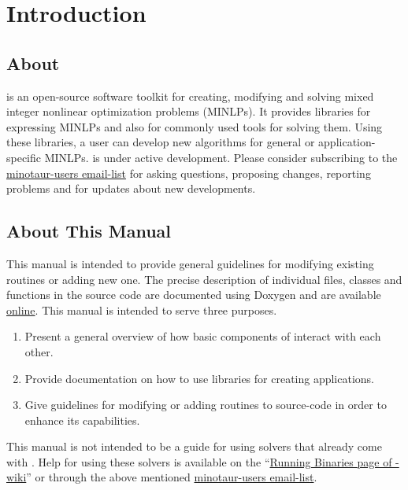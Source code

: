 \section{Introduction}
\subsection{About \mntr}

\mntr{} is an open-source software toolkit for creating, modifying and solving
mixed integer nonlinear optimization problems (MINLPs). It provides libraries
for expressing MINLPs and also for commonly used tools for solving them.
 Using these libraries, a user can develop
new algorithms for general or application-specific MINLPs.  \mntr{} is under
active development. Please consider subscribing to the
\href{https://lists.mcs.anl.gov/mailman/listinfo/minotaur}{minotaur-users
email-list} for asking questions, proposing changes, reporting problems and
for updates about new developments.

\subsection{About This Manual}
This manual is intended to provide general guidelines for modifying existing
routines or adding new one. The precise description of individual files,
classes and functions in the source code are documented using Doxygen and are
available
\href{http://www.mcs.anl.gov/research/projects/minotaur/nightly/doxygen/}{online}.
This manual is intended to serve three purposes.
\begin{enumerate}
\item Present a general
overview of how basic components of \mntr{} interact with each other.
\item Provide documentation on how to use \mntr{} libraries for creating applications.
\item Give guidelines for modifying or adding routines to \mntr{} source-code
in order to enhance its capabilities.
\end{enumerate}

This manual is not intended to be a guide for using solvers that already come with
\mntr{}. Help for using these solvers is available on the
``\href{http://wiki.mcs.anl.gov/minotaur/index.php/Running\_Binaries}{Running
Binaries page of \mntr-wiki}'' or through the above mentioned
\href{https://lists.mcs.anl.gov/mailman/listinfo/minotaur}{minotaur-users
email-list}.
